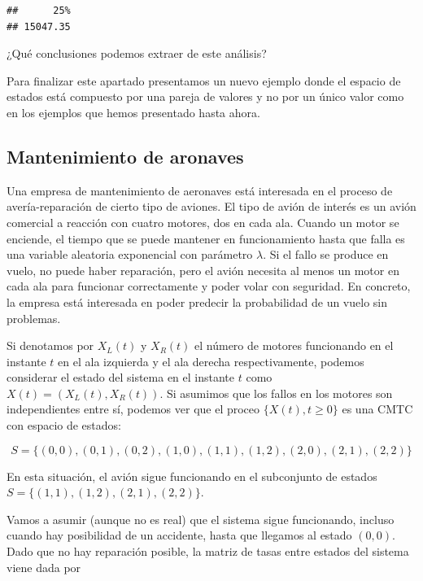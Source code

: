 \documentclass[
]{book}
\theoremstyle{definition}
\theoremstyle{definition}
\theoremstyle{definition}
\theoremstyle{definition}
\theoremstyle{remark}
\begin{document}
\begin{verbatim}
##      25% 
## 15047.35
\end{verbatim}

¿Qué conclusiones podemos extraer de este análisis?

Para finalizar este apartado presentamos un nuevo ejemplo donde el espacio de estados está compuesto por una pareja de valores y no por un único valor como en los ejemplos que hemos presentado hasta ahora.

\hypertarget{mantenimiento-de-aronaves}{%
\subsection{Mantenimiento de aronaves}\label{mantenimiento-de-aronaves}}

Una empresa de mantenimiento de aeronaves está interesada en el proceso de avería-reparación de cierto tipo de aviones. El tipo de avión de interés es un avión comercial a reacción con cuatro motores, dos en cada ala. Cuando un motor se enciende, el tiempo que se puede mantener en funcionamiento hasta que falla es una variable aleatoria exponencial con parámetro \(\lambda\). Si el fallo se produce en vuelo, no puede haber reparación, pero el avión necesita al menos un motor en cada ala para funcionar correctamente y poder volar con seguridad. En concreto, la empresa está interesada en poder predecir la probabilidad de un vuelo sin problemas.

Si denotamos por \(X_L(t)\) y \(X_R(t)\) el número de motores funcionando en el instante \(t\) en el ala izquierda y el ala derecha respectivamente, podemos considerar el estado del sistema en el instante \(t\) como \(X(t) = (X_L(t), X_R(t))\). Si asumimos que los fallos en los motores son independientes entre sí, podemos ver que el proceo \(\{X(t), t \geq 0\}\) es una CMTC con espacio de estados:

\[S = \{ (0, 0), (0, 1), (0, 2), (1, 0), (1, 1), (1, 2), (2, 0), (2, 1), (2,2) \}\]

En esta situación, el avión sigue funcionando en el subconjunto de estados \(S = \{ (1, 1), (1, 2), (2, 1), (2,2) \}\).

Vamos a asumir (aunque no es real) que el sistema sigue funcionando, incluso cuando hay posibilidad de un accidente, hasta que llegamos al estado \((0, 0)\). Dado que no hay reparación posible, la matriz de tasas entre estados del sistema viene dada por
\end{document}
